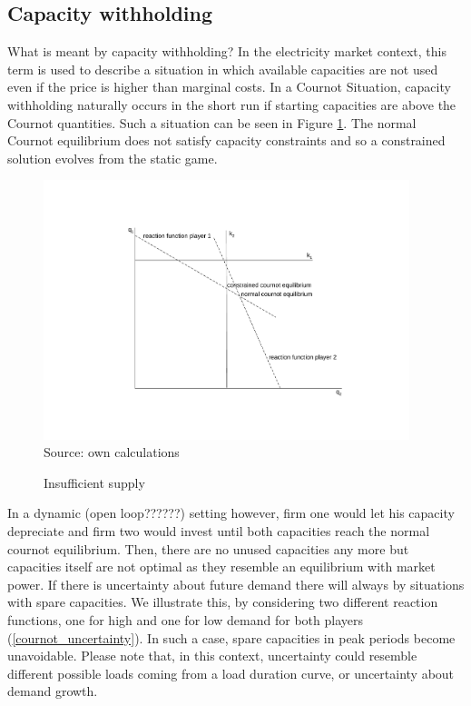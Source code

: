 \subsection{Capacity withholding}

What is meant by capacity withholding? In the electricity market context, this term is used to describe a situation in which available capacities are not used even if the price is higher than marginal costs. In a Cournot Situation, capacity withholding naturally occurs in the short run if starting capacities are above the Cournot quantities. Such a situation can be seen in Figure \ref{cournot}. The normal Cournot equilibrium does not satisfy capacity constraints and so a constrained solution evolves from the static game.

\begin{figure}[h]
\centering
\caption{Insufficient supply}
\includegraphics[width=4.2in]{capacity/Cournot.pdf}
      \label{cournot}  
\\          
\scriptsize Source: own calculations
\end{figure}

In a dynamic (open loop??????) setting however, firm one would let his capacity depreciate and firm two would invest until both capacities reach the normal cournot equilibrium. Then, there are no unused capacities any more but capacities itself are not optimal as they resemble an equilibrium with market power. 
If there is uncertainty about future demand there will always by situations with spare capacities. We illustrate this, by considering two different reaction functions, one for high and one for low demand for both players (\ref{cournot_uncertainty}). In such a case, spare capacities in peak periods become unavoidable. Please note that, in this context, uncertainty could resemble different possible loads coming from a load duration curve, or uncertainty about demand growth.

